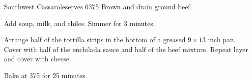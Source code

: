 
\begin{recipe}{Southwest Cassarole}{serves 6}{375\0}
    Brown and drain ground beef.

    Add soup, milk, and chiles. Simmer for 3 minutes.

    Arrange half of the tortilla strips in the bottom of a greased $9 \times 13$ inch pan. Cover with half of the enchilada sauce and half of the beef mixture. Repeat layer and cover with cheese.

    \newstep
    Bake at 375\0 for 25 minutes.

\end{recipe}
